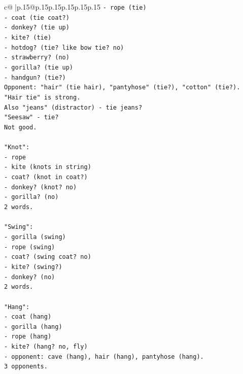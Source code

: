 \documentclass{article}
\begin{document}
{\begin{supertabular}{c@{$\;$}|p{.15\linewidth}@{}p{.15\linewidth}p{.15\linewidth}p{.15\linewidth}p{.15\linewidth}p{.15\linewidth}}
{{{\texttt{{-} rope (tie)} \\
\texttt{{-} coat (tie coat?)} \\
\texttt{{-} donkey? (tie up)} \\
\texttt{{-} kite? (tie)} \\
\texttt{{-} hotdog? (tie? like bow tie? no)} \\
\texttt{{-} strawberry? (no)} \\
\texttt{{-} gorilla? (tie up)} \\
\texttt{{-} handgun? (tie?)} \\
\texttt{Opponent: "hair" (tie hair), "pantyhose" (tie?), "cotton" (tie?).} \\
\texttt{"Hair tie" is strong.} \\
\texttt{Also "jeans" (distractor) {-} tie jeans?} \\
\texttt{"Seesaw" {-} tie?} \\
\texttt{Not good.} \\
\\ 
\texttt{"Knot":} \\
\texttt{{-} rope} \\
\texttt{{-} kite (knots in string)} \\
\texttt{{-} coat? (knot in coat?)} \\
\texttt{{-} donkey? (knot? no)} \\
\texttt{{-} gorilla? (no)} \\
\texttt{2 words.} \\
\\ 
\texttt{"Swing":} \\
\texttt{{-} gorilla (swing)} \\
\texttt{{-} rope (swing)} \\
\texttt{{-} coat? (swing coat? no)} \\
\texttt{{-} kite? (swing?)} \\
\texttt{{-} donkey? (no)} \\
\texttt{2 words.} \\
\\ 
\texttt{"Hang":} \\
\texttt{{-} coat (hang)} \\
\texttt{{-} gorilla (hang)} \\
\texttt{{-} rope (hang)} \\
\texttt{{-} kite? (hang? no, fly)} \\
\texttt{{-} opponent: cave (hang), hair (hang), pantyhose (hang).} \\
\texttt{3 opponents.} \\
}}}
\end{supertabular}}
\end{document}
